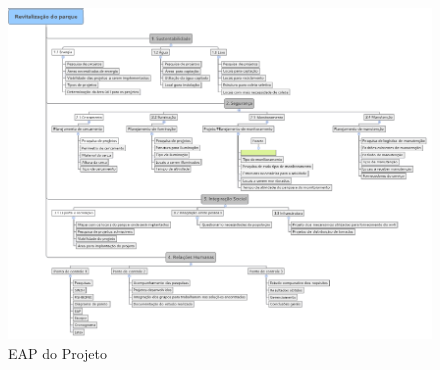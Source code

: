 \begin{figure}[h]
	\centering
	\label{EAP}
		\includegraphics[keepaspectratio=true,scale=0.9,angle=270]{figuras/EAP-GERAL.png}
	\caption{EAP do Projeto}
\end{figure}


	